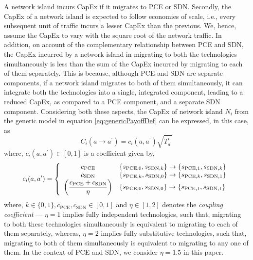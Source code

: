 \documentclass[smallextended]{svjour3}
\begin{document}
\par A network island incurs CapEx if it migrates to PCE or SDN.
Secondly, the CapEx of a network island is expected to follow economies of
scale, i.e.,  every subsequent unit of traffic incurs a lesser CapEx than the
previous.
We, hence, assume the CapEx to vary with the square root of the network traffic.
In addition, on account of the complementary relationship between PCE and SDN,
the CapEx incurred by a network island in migrating to both the technologies
simultaneously is less than the sum of the CapEx incurred by migrating to each
of them separately. This is because, although PCE and SDN are separate
components, if a network island migrates to both of them simultaneously, it can
integrate both the technologies into a single, integrated component, leading to
a reduced CapEx, as compared to a PCE component, and a separate SDN component.
Considering both these aspects, the CapEx of network island $N_i$ from the
generic model in equation \eqref{eq:genericPayoffDef} can be expressed, in this case, as
\begin{equation}\label{eq:capex definition}
C_i(a \to a^\prime) = c_i(a,a^\prime)\sqrt{T_{a^\prime}^i}
\end{equation}
where, $c_i(a,a^\prime) \in [0,1]$ is a coefficient given by,
\begin{multline} \label{eq:capex coefficients}
c_i(a,a^\prime)=
\left\{\begin{array}{c l}
c_\textrm{PCE}& \{s_{\textrm{PCE},0},s_{\textrm{SDN},k}\}\to\{s_{\textrm{PCE},1},s_{\textrm{SDN},k}\} \\
c_\textrm{SDN}& \{s_{\textrm{PCE},k},s_{\textrm{SDN},0}\}\to\{s_{\textrm{PCE},k},s_{\textrm{SDN},1}\} \\
\left(\dfrac{c_\textrm{PCE}+c_\textrm{SDN}}{\eta}\right)&\{s_{\textrm{PCE},0},s_{\textrm{SDN},0}\} \to \{s_{\textrm{PCE},1},s_{\textrm{SDN},1}\} \\
\end{array} \right.
\end{multline}
where, $k \in \{0,1\}, c_\textrm{PCE}, c_\textrm{SDN} \in [0,1]$ and $\eta \in [1,2]$ denotes the \emph{coupling coefficient} ---
$\eta = 1$ implies fully independent technologies, such that, migrating to
both these technologies simultaneously is equivalent to migrating to each of
them separately, whereas, $\eta = 2$ implies fully substitutive
technologies, such that, migrating to both of them simultaneously is equivalent to
migrating to any one of them. In the context of PCE and SDN, we consider
$\eta = 1.5$ in this paper.
\end{document}

